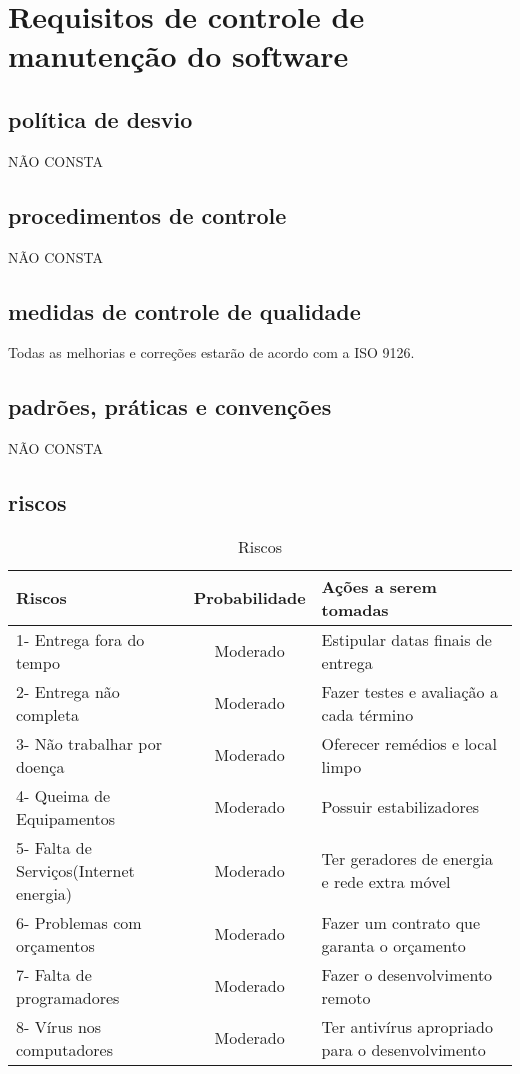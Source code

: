 \chapter{Requisitos de controle de manutenção do software}

\section{política de desvio}
NÃO CONSTA
\section{procedimentos de controle}
NÃO CONSTA
\section{medidas de controle de qualidade}
Todas as melhorias e correções  estarão de acordo com a ISO 9126.
\section{padrões, práticas e convenções}
NÃO CONSTA
\section{riscos}
\begin{table}[!htb]
	\caption[Riscos]{Riscos}
	\label{tab:riscos}
	\centering
	\begin{tabular}{l|c|l}
		Riscos                           &  Probabilidade        &  Ações a serem tomadas		\\ \hline
		1- Entrega fora do tempo         &  Moderado             &  Estipular datas finais de entrega 	 \\
	  2- Entrega não completa          & 	Moderado	           &  Fazer testes e avaliação a cada término    \\
    3- Não trabalhar por doença      & 	Moderado	           &  Oferecer remédios e local limpo          	 \\
    4- Queima de Equipamentos		& Moderado		& Possuir estabilizadores 			\\
    5- Falta de Serviços(Internet energia)		& Moderado 		& Ter geradores de energia e rede extra móvel \\
    6- Problemas com orçamentos		& Moderado		& Fazer um contrato que garanta o orçamento \\
    7- Falta de programadores		& Moderado		& Fazer o desenvolvimento remoto \\
    8- Vírus nos computadores		& Moderado		& Ter antivírus apropriado para o desenvolvimento \\
	\end{tabular}
\end{table}

